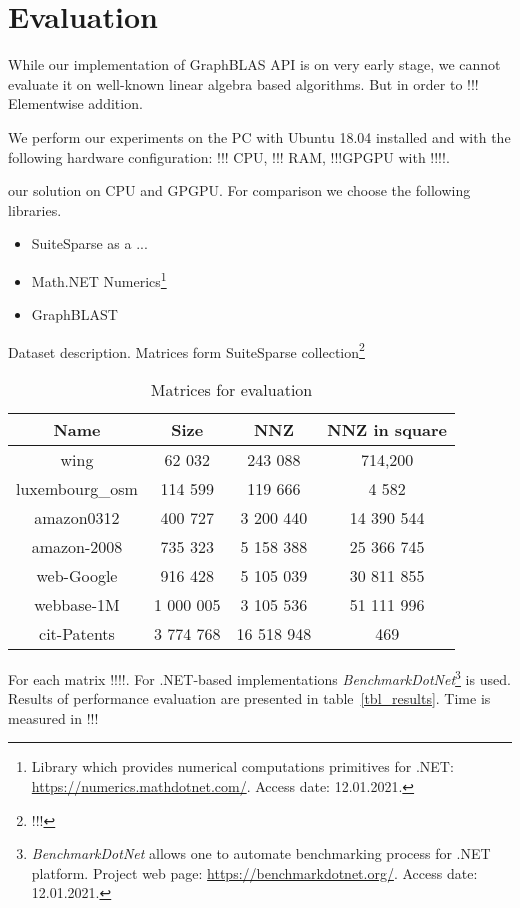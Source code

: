 \section{Evaluation}

While our implementation of GraphBLAS API is on very early stage, we cannot evaluate it on well-known linear algebra based algorithms. 
But in order to !!! Elementwise addition. 

We perform our experiments on the PC with Ubuntu 18.04 installed and with the following hardware configuration: !!! CPU, !!! RAM, !!!GPGPU with !!!!.

our solution on CPU and GPGPU.
For comparison we choose the following libraries.
\begin{itemize}
\item SuiteSparse as a ...
\item Math.NET Numerics\footnote{Library which provides numerical computations primitives for .NET: \url{https://numerics.mathdotnet.com/}. Access date: 12.01.2021.}
\item GraphBLAST
\end{itemize}



Dataset description. Matrices form SuiteSparse collection\footnote{!!!}

\begin{table}[h]
    \centering
    \caption{Matrices for evaluation}
    \label{matrices}  
    \begin{tabular}{ | c || c | c | c | }
    \hline
    Name & Size & NNZ & NNZ in square \\ \hline
    \hline
    wing & 62 032 & 243 088 & 714,200 \\ \hline
    luxembourg\_osm & 114 599 & 119 666 & 4 582 \\ \hline
    amazon0312 & 400 727 & 3 200 440 & 14 390 544 \\ \hline
    amazon-2008 & 735 323 & 5 158 388 & 25 366 745 \\ \hline
    web-Google & 916 428 & 5 105 039 & 30 811 855 \\ \hline
    webbase-1M & 1 000 005 & 3 105 536 & 51 111 996 \\ \hline
    cit-Patents & 3 774 768 & 16 518 948 & 469 \\ \hline
    \end{tabular}
\end{table}

For each matrix !!!!.
For .NET-based implementations \textit{BenchmarkDotNet}\footnote{\textit{BenchmarkDotNet} allows one to automate benchmarking process for .NET platform. Project web page: \url{https://benchmarkdotnet.org/}. Access date: 12.01.2021.} is used.
Results of performance evaluation are presented in table~\ref{tbl_results}.
Time is measured in !!!


